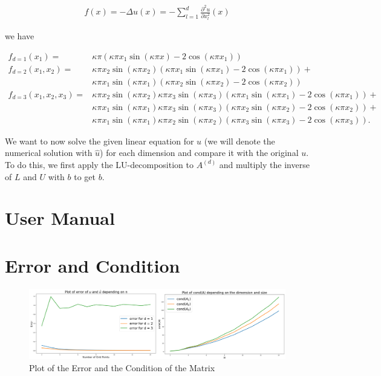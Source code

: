 \documentclass[refman]{article}
\theoremstyle{definition}
\begin{document}
\begin{align*}
	f(x) = - \Delta u(x) = -\sum_{l = 1}^d \frac{\partial^2 u}{\partial x_l^2} (x)
\end{align*}

we have

\begin{align*}
	f_{d=1} (x_1) =& \kappa \pi \left( \kappa \pi x_1 \sin ( \kappa \pi x ) - 2 \cos( \kappa \pi x_1) \right) \\
%	
	f_{d=2} (x_1, x_2) =& \kappa \pi x_2 \sin( \kappa \pi x_2) \left(  \kappa \pi x_1 \sin(\kappa \pi x_1) - 2 \cos ( \kappa \pi x_1) \right) + \\ 
	& \kappa \pi x_1 \sin( \kappa \pi x_1) \left(  \kappa \pi x_2 \sin(\kappa \pi x_2) - 2 \cos ( \kappa \pi x_2) \right) \\
%
	f_{d=3} (x_1, x_2, x_3) =& \kappa \pi x_2 \sin( \kappa \pi x_2) \kappa \pi x_3 \sin(\kappa \pi x_3)  \left(  \kappa \pi x_1 \sin(\kappa \pi x_1) - 2 \cos ( \kappa \pi x_1) \right) + \\
	& \kappa \pi x_1 \sin( \kappa \pi x_1) \kappa \pi x_3 \sin(\kappa \pi x_3)  \left(  \kappa \pi x_2 \sin(\kappa \pi x_2) - 2 \cos ( \kappa \pi x_2) \right) + \\
	& \kappa \pi x_1 \sin( \kappa \pi x_1) \kappa \pi x_2 \sin(\kappa \pi x_2)  \left(  \kappa \pi x_3 \sin(\kappa \pi x_3) - 2 \cos ( \kappa \pi x_3) \right) \text{.}
\end{align*}

We want to now solve the given linear equation for \(u\) (we will denote the numerical solution with \(\hat{u}\)) for each dimension and compare it with the original \(u\). To do this, we first apply the LU-decomposition to \(A^{(d)}\) and multiply the inverse of \(L\) and \(U\) with \(b\) to get \(b\).

\section{User Manual}

\section{Error and Condition}

\begin{figure}[h]
	\includegraphics[width=\linewidth]{graphics/error_condition.png}
	\caption{Plot of the Error and the Condition of the Matrix}
	\label{fig:plot_error}
\end{figure}
\end{document}
